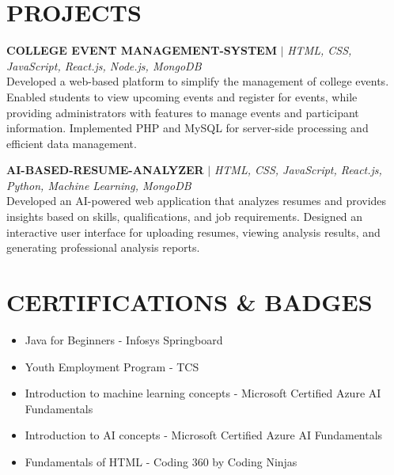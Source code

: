 \documentclass[9.5pt,a4paper]{extarticle}
\begin{document}
\section*{PROJECTS}
\noindent \textbf{COLLEGE EVENT MANAGEMENT-SYSTEM} $|$ \textit{HTML, CSS, JavaScript, React.js, Node.js, MongoDB} \\
Developed a web-based platform to simplify the management of college events. Enabled students to view upcoming events and register for events, while providing administrators with features to manage events and participant information. Implemented PHP and MySQL for server-side processing and efficient data management. \vspace{4pt}

\noindent \textbf{AI-BASED-RESUME-ANALYZER} $|$ \textit{HTML, CSS, JavaScript, React.js, Python, Machine Learning, MongoDB} \\
Developed an AI-powered web application that analyzes resumes and provides insights based on skills, qualifications, and job requirements. Designed an interactive user interface for uploading resumes, viewing analysis results, and generating professional analysis reports.
\section*{CERTIFICATIONS \& BADGES}
\begin{itemize}[leftmargin=0.2in, itemsep=1pt, topsep=1pt]
\item Java for Beginners - Infosys Springboard
\item Youth Employment Program - TCS
\item Introduction to machine learning concepts - Microsoft Certified Azure AI Fundamentals
\item Introduction to AI concepts - Microsoft Certified Azure AI Fundamentals
\item Fundamentals of HTML - Coding 360 by Coding Ninjas
\end{itemize}
\end{document}
